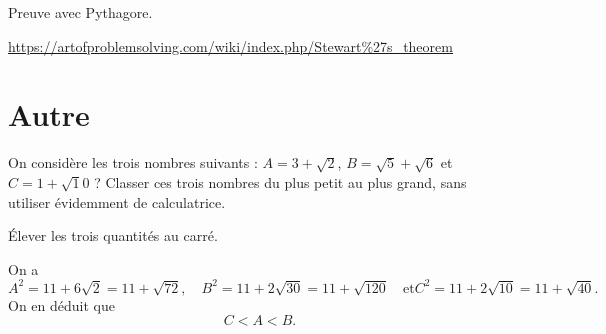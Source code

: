 \begin{exo}
Preuve avec Pythagore.
\begin{center}
\begin{tikzpicture}
\end{tikzpicture}
\end{center}
\begin{hint}
\end{hint}
\begin{sol}
\url{https://artofproblemsolving.com/wiki/index.php/Stewart%27s_theorem}
\end{sol}
\end{exo}


\begin{exo}
\begin{center}
\begin{tikzpicture}
\end{tikzpicture}
\end{center}
\begin{hint}
\end{hint}
\begin{sol}
\end{sol}
\end{exo}


\section{Autre}



\begin{exo}

On considère les trois nombres suivants : $A=3+\sqrt 2$, $B=\sqrt 5 +\sqrt 6$ et $C=1+\sqrt 10$ ?
Classer ces trois nombres du plus petit au plus grand, sans utiliser évidemment de calculatrice.
\begin{hint}
Élever les trois quantités au carré.
\end{hint}
\begin{sol}
On a 
\[
A^2 = 11+6\sqrt 2 = 11+\sqrt{72},\quad
B^2 = 11+2\sqrt{30}=11+\sqrt{120} \quad\text{et}
C^2 = 11+2\sqrt{10}=11+\sqrt{40}.\]
On en déduit que 
\[ C< A < B.\]
\end{sol}
\end{exo}





\indications
\correction



